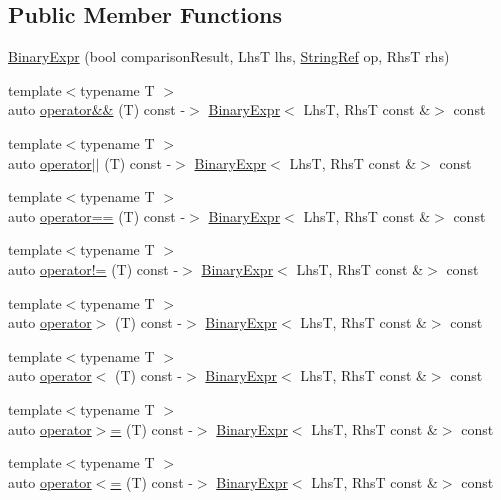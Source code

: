\subsection*{Public Member Functions}
\begin{DoxyCompactItemize}
\item 
\mbox{\hyperlink{class_catch_1_1_binary_expr_a657d66346aef97a760c22776fe6008b6}{Binary\+Expr}} (bool comparison\+Result, LhsT lhs, \mbox{\hyperlink{class_catch_1_1_string_ref}{String\+Ref}} op, RhsT rhs)
\item 
{\footnotesize template$<$typename T $>$ }\\auto \mbox{\hyperlink{class_catch_1_1_binary_expr_ab51d6e5b8303c5777fd5af916e2fafff}{operator\&\&}} (T) const -\/$>$ \mbox{\hyperlink{class_catch_1_1_binary_expr}{Binary\+Expr}}$<$ LhsT, RhsT const \&$>$ const
\item 
{\footnotesize template$<$typename T $>$ }\\auto \mbox{\hyperlink{class_catch_1_1_binary_expr_a44234233ad4fa42e7c95b6a0d94af9db}{operator$\vert$$\vert$}} (T) const -\/$>$ \mbox{\hyperlink{class_catch_1_1_binary_expr}{Binary\+Expr}}$<$ LhsT, RhsT const \&$>$ const
\item 
{\footnotesize template$<$typename T $>$ }\\auto \mbox{\hyperlink{class_catch_1_1_binary_expr_a56d7983b7c826c4924423618ffb40e44}{operator==}} (T) const -\/$>$ \mbox{\hyperlink{class_catch_1_1_binary_expr}{Binary\+Expr}}$<$ LhsT, RhsT const \&$>$ const
\item 
{\footnotesize template$<$typename T $>$ }\\auto \mbox{\hyperlink{class_catch_1_1_binary_expr_a1c5d4b87cc18452ebe1254e0067dd476}{operator!=}} (T) const -\/$>$ \mbox{\hyperlink{class_catch_1_1_binary_expr}{Binary\+Expr}}$<$ LhsT, RhsT const \&$>$ const
\item 
{\footnotesize template$<$typename T $>$ }\\auto \mbox{\hyperlink{class_catch_1_1_binary_expr_a70b66bfaa6df6f8d04e243fda3e0e1e4}{operator$>$}} (T) const -\/$>$ \mbox{\hyperlink{class_catch_1_1_binary_expr}{Binary\+Expr}}$<$ LhsT, RhsT const \&$>$ const
\item 
{\footnotesize template$<$typename T $>$ }\\auto \mbox{\hyperlink{class_catch_1_1_binary_expr_a8328cde75134e02d7d44c5277db96c09}{operator$<$}} (T) const -\/$>$ \mbox{\hyperlink{class_catch_1_1_binary_expr}{Binary\+Expr}}$<$ LhsT, RhsT const \&$>$ const
\item 
{\footnotesize template$<$typename T $>$ }\\auto \mbox{\hyperlink{class_catch_1_1_binary_expr_a334b84ac38c19c7c961a6d974a6c7d73}{operator$>$=}} (T) const -\/$>$ \mbox{\hyperlink{class_catch_1_1_binary_expr}{Binary\+Expr}}$<$ LhsT, RhsT const \&$>$ const
\item 
{\footnotesize template$<$typename T $>$ }\\auto \mbox{\hyperlink{class_catch_1_1_binary_expr_a8773a729df3a465cad4e270e912db436}{operator$<$=}} (T) const -\/$>$ \mbox{\hyperlink{class_catch_1_1_binary_expr}{Binary\+Expr}}$<$ LhsT, RhsT const \&$>$ const
\end{DoxyCompactItemize}
